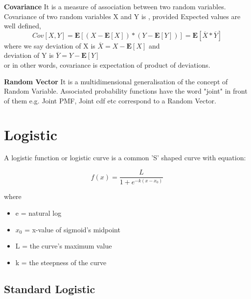 \documentclass[10pt,a4paper]{article}
\begin{document}
	\begin{defn}{\textbf{Covariance}}
	It is a measure of association between two random variables.
	Covariance of two random variables X and Y is , provided Expected values are well defined,
	\begin{equation}
		Cov[X,Y] = \mathbf{E}[ (X - \mathbf{E}[X]) * (Y - \mathbf{E}[Y]) ] = \mathbf{E}[\overline{X} * \overline{Y}]
	\end{equation}
	where we say deviation of X is $\overline{X} = X - \mathbf{E}[X]$ and \\
	deviation of Y is $\overline{Y} = Y - \mathbf{E}[Y]$\\
	or in other words, covariance is expectation of product of deviations.
	\end{defn}

	\begin{defn}{\textbf{Random Vector}}
	It is a multidimensional generalisation of the concept of Random Variable. Associated probability functions have the word "joint" in front of them e.g. Joint PMF, Joint cdf etc correspond to a Random Vector.
	\end{defn}

	\section{Logistic}	
	A logistic function or logistic curve is a common 'S' shaped curve with equation:
	
	\begin{equation}
			f(x) = \frac{L}{1 + e^{-k(x-x_0)}}
	\end{equation}

	
	where
	\begin{itemize}
		\item e = natural log
		\item $x_0$ = x-value of sigmoid's midpoint
		\item L = the curve's maximum value
		\item k = the steepness of the curve
	\end{itemize}

	\subsection{Standard Logistic}
	
\end{document}
